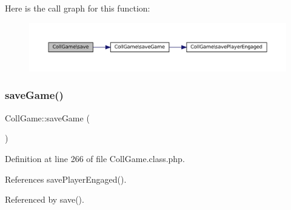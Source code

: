 Here is the call graph for this function\+:\nopagebreak
\begin{figure}[H]
\begin{center}
\leavevmode
\includegraphics[width=350pt]{class_coll_game_a5a48c2bf061280bf901567acf9e6b131_cgraph}
\end{center}
\end{figure}
\mbox{\label{class_coll_game_a957e9a00e3ce38129276f8454a242dcd}} 
\subsubsection{\texorpdfstring{save\+Game()}{saveGame()}}
{\footnotesize\ttfamily Coll\+Game\+::save\+Game (\begin{DoxyParamCaption}{ }\end{DoxyParamCaption})\hspace{0.3cm}{\ttfamily [protected]}}



Definition at line 266 of file Coll\+Game.\+class.\+php.



References save\+Player\+Engaged().



Referenced by save().

